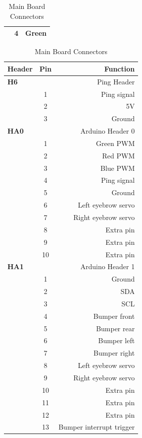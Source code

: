 \documentclass[technical_document.tex]{subfiles}
\begin{document}
\begin{table}[ht!]
\begin{minipage}[b]{0.5\linewidth}
\begin{tabular}{| l | c | r |}
				&		4			&	Green			\\ \hline
 \end{tabular}	
 \end{minipage}
   \hspace{2mm}
   \begin{minipage}[b]{0.5\linewidth}
   \begin{tabular}{| l | c | r |}
   \hline
    {\bf Header} 		& 		{\bf Pin} 		& 	{\bf Function} 		\\ \hline	
 {\bf H6}	 		&	 				&	Ping Header		\\ \hline 
   				&		1			&       Ping signal		\\ \hline
				&		2			&	5V				\\ \hline
				&		3			&	Ground			\\ \hline
 {\bf HA0}	 		&	 				&	Arduino Header 0	\\ \hline 
   				&		1			&      	Green PWM 		\\ \hline
				&		2			&	Red PWM			\\ \hline
				&		3			&	Blue PWM		\\ \hline
				&		4			&	Ping	signal		\\ \hline
				&		5			&	Ground			\\ \hline
				&		6			&	Left eyebrow servo	\\ \hline
				&		7			&	Right eyebrow servo	\\ \hline
				&		8			&	Extra pin			\\ \hline
				&		9			&	Extra pin			\\ \hline
				&		10			&	Extra pin			\\ \hline
 {\bf HA1}	 		&	 				&	Arduino Header 1	\\ \hline 
   				&		1			&       Ground			\\ \hline
				&		2			&	SDA				\\ \hline
				&		3			&	SCL				\\ \hline
				&		4			&	Bumper front		\\ \hline
				&		5			&	Bumper rear		\\ \hline
				&		6			&	Bumper left		\\ \hline
				&		7			&	Bumper right		\\ \hline
				&		8			&	Left eyebrow servo	\\ \hline
				&		9			&	Right eyebrow servo	\\ \hline
				&		10			&	Extra pin			\\ \hline
				&		11			&	Extra pin			\\ \hline
				&		12			&	Extra pin			\\ \hline
				&		13			&	Bumper interrupt trigger	\\ \hline
				
				
  \end{tabular}
  \end{minipage}
\caption{Main Board Connectors}
\label{tab:mainBoardConnectors}
\end{table}
\end{document}

